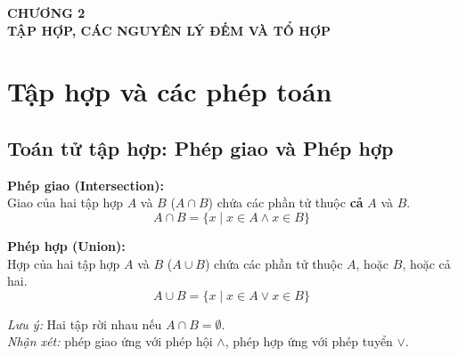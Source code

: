 \documentclass[12pt,a4paper]{article}
\begin{document}
\begin{center}
  {\LARGE\bfseries\color{PrimaryBlue} CHƯƠNG 2}\\[4pt]
  {\large\bfseries TẬP HỢP, CÁC NGUYÊN LÝ ĐẾM VÀ TỔ HỢP}
\end{center}
\vspace{4pt}

\section{Tập hợp và các phép toán}

\subsection{Toán tử tập hợp: Phép giao và Phép hợp}

\noindent
\begin{minipage}[t]{0.60\textwidth}
\textbf{Phép giao (Intersection):}\\
Giao của hai tập hợp $A$ và $B$ ($A \cap B$) chứa các phần tử thuộc \textbf{cả} $A$ và $B$.
\[
  A \cap B = \{x \mid x \in A \land x \in B\}
\]

\vspace{6pt}
\textbf{Phép hợp (Union):}\\
Hợp của hai tập hợp $A$ và $B$ ($A \cup B$) chứa các phần tử thuộc $A$, hoặc $B$, hoặc cả hai.
\[
  A \cup B = \{x \mid x \in A \lor x \in B\}
\]

\vspace{6pt}
\textit{Lưu ý:} Hai tập rời nhau nếu $A \cap B = \emptyset$.\\
\textit{Nhận xét:} phép giao ứng với phép hội $\land$, phép hợp ứng với phép tuyển $\lor$.
\end{minipage}
\hfill
\begin{minipage}[t]{0.36\textwidth}
\centering
\vspace{0pt}

\vspace{10pt}
\end{minipage}
\end{document}
